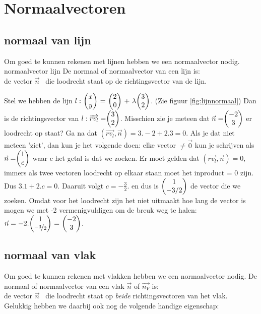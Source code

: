 \section{Normaalvectoren}
\subsection{normaal van lijn}

Om goed te kunnen rekenen met lijnen hebben we een normaalvector nodig.
\mydef
{normaalvector lijn}
{De normaal of normaalvector van een lijn is: \\
	de vector $ \vec{n} $  \ die loodrecht staat op de richtingsvector van de lijn.}

Stel we hebben de lijn $ l: \  \vectwee {x}{y} \ = \ \vectwee {2}{0} \ +\  \lambda  \vectwee {3}{2}  $. (Zie figuur  \ref{fig:lijnnormaal})
Dan is de richtingsvector van $ l:  \overrightarrow{rv_{l}} =  \vectwee {3}{2} $. Misschien zie je meteen dat $ \vec{n} =  \vectwee {-2}{3} $ er loodrecht op staat? Ga na dat  $ (\overrightarrow{rv_{l} }, \vec{n}) = 3.-2 + 2.3  = 0 $. Als je dat niet meteen 'ziet', dan kun je het volgende doen: elke vector  $ \ne \vec{0} $ kun je schrijven als  $ \vec{n} = \vectwee {1}{c} $ waar c het getal is dat we zoeken. Er moet gelden dat  $ (\overrightarrow{rv_{l} }, \vec{n}) = 0 $, immers als twee vectoren loodrecht op elkaar staan moet het inproduct = 0 zijn. Dus $ 3.1 + 2.c = 0 $. Daaruit volgt $ c =  -\frac{3}{2}. $ en dus is $ \vectwee {1}{-3/2} $ de vector die we zoeken. Omdat voor het loodrecht zijn het niet uitmaakt hoe lang de vector is mogen we met -2 vermenigvuldigen om de breuk weg te halen: $ \vec{n} = -2.\vectwee {1}{\nicefrac{-3}{2}} \ = \  \vectwee {-2}{3} $. 


\subsection{normaal van vlak}

Om goed te kunnen rekenen met vlakken hebben we een normaalvector nodig.
\label{vlaknormaal}
{De normaal of normaalvector van een vlak $\vec{n}$ of  $\overrightarrow{n_{V}}$ is:
	\\ de vector $ \vec{n} $  \ die loodrecht staat op \textit{beide} richtingsvectoren van het vlak. \\ 
	Gelukkig hebben we daarbij ook nog de volgende handige eigenschap:}

